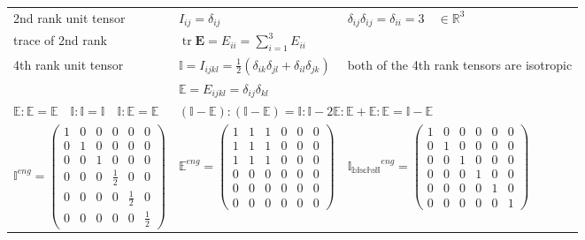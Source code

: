 	\begin{tabularx}{\columnwidth}{lXX}
		\hline
		2nd rank unit tensor & $I_{ij} = \delta_{ij}$ &$\delta_{ij}\delta_{ij} = \delta_{ii} = 3 \quad  \in \mathbb{R}^3$  \\
		trace of 2nd rank & $\operatorname{tr} \mathbf{E} = E_{ii} = \sum\limits_{i=1}^3 E_{ii}$ &\\
		4th rank unit tensor & $\mathbb{I} = I_{ijkl} = \frac{1}{2}(\delta_{ik}\delta_{jl} + \delta_{il}\delta_{jk}) $ & both of the 4th rank tensors are isotropic\\
						 & $\mathbb{E} = E_{ijkl} =  \delta_{ij}\delta_{kl}$ &\\
						 
		$\mathbb{E}:\mathbb{E} = \mathbb{E} \quad \mathbb{I}:\mathbb{I}=\mathbb{I} \quad \mathbb{I}:\mathbb{E} = \mathbb{E}$&
		\multicolumn{2}{l}{$(\mathbb{I}-\mathbb{E}):(\mathbb{I}-\mathbb{E}) = \mathbb{I}:\mathbb{I}-2\mathbb{E}:\mathbb{E} + \mathbb{E}:\mathbb{E} = \mathbb{I}-\mathbb{E}$}\\				 
		$ \mathbb{I}^{eng}=
		\begin{pmatrix}
			1 & 0 & 0 & 0 & 0 & 0 \\ 
			0 & 1 & 0 & 0 & 0 & 0 \\ 
			0 & 0 & 1 & 0 & 0 & 0 \\ 
			0 & 0 & 0 & \frac{1}{2} & 0 & 0 \\ 
			0 & 0 & 0 & 0 & \frac{1}{2} & 0 \\ 
			0 & 0 & 0 & 0 & 0 & \frac{1}{2}
		\end{pmatrix}$& 
		
		$
		\mathbb{E}^{eng}=
		\begin{pmatrix}
		1 & 1 & 1 & 0 & 0 & 0 \\ 
		1 & 1 & 1 & 0 & 0 & 0 \\ 
		1 & 1 & 1 & 0 & 0 & 0 \\ 
		0 & 0 & 0 & 0 & 0 & 0 \\ 
		0 & 0 & 0 & 0 & 0 & 0 \\ 
		0 & 0 & 0 & 0 & 0 & 0
		\end{pmatrix} 
		$	&
		$ \mathbb{I_{\text{bischsil}}}^{eng}=
		\begin{pmatrix}
		1 & 0 & 0 & 0 & 0 & 0 \\ 
		0 & 1 & 0 & 0 & 0 & 0 \\ 
		0 & 0 & 1 & 0 & 0 & 0 \\ 
		0 & 0 & 0 & 1 & 0 & 0 \\ 
		0 & 0 & 0 & 0 & 1 & 0 \\ 
		0 & 0 & 0 & 0 & 0 & 1
		\end{pmatrix}$
			\\
							 
   	   \hline
	\end{tabularx}
	
